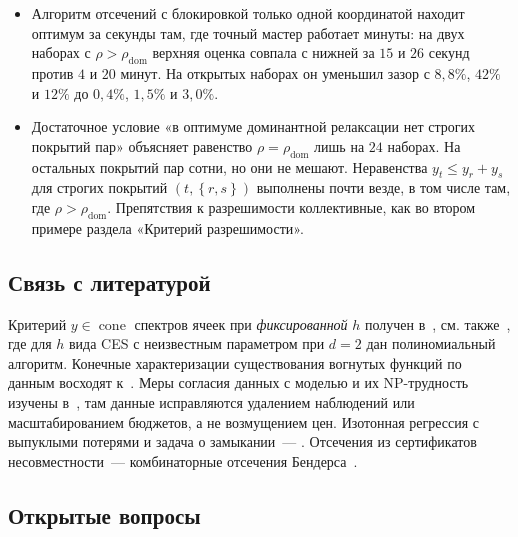 \documentclass[a4paper,11pt]{article}
\theoremstyle{plain}
\theoremstyle{definition}
\theoremstyle{remark}
\newcommand{\set}[1]{\left\{ #1 \right\}}
\DeclareMathOperator{\cone}{cone}
\begin{document}
\begin{itemize}
    \item Алгоритм отсечений с блокировкой только одной координатой находит оптимум за секунды там, где точный мастер работает минуты: на двух наборах с $\rho>\rho_{\mathrm{dom}}$ верхняя оценка совпала с нижней за $15$ и $26$ секунд против $4$ и $20$ минут. На открытых наборах он уменьшил зазор с $8{,}8\%$, $42\%$ и $12\%$ до $0{,}4\%$, $1{,}5\%$ и $3{,}0\%$.
    \item Достаточное условие «в оптимуме доминантной релаксации нет строгих покрытий пар» объясняет равенство $\rho=\rho_{\mathrm{dom}}$ лишь на $24$ наборах. На остальных покрытий пар сотни, но они не мешают. Неравенства $y_t\le y_r+y_s$ для строгих покрытий $(t,\set{r,s})$ выполнены почти везде, в том числе там, где $\rho>\rho_{\mathrm{dom}}$. Препятствия к разрешимости коллективные, как во втором примере раздела «Критерий разрешимости».
\end{itemize}

\subsection{Связь с литературой}

Критерий $y\in\cone$ спектров ячеек при \emph{фиксированной} $h$ получен в~\cite{Shananin99}, см. также~\cite{AMS}, где для $h$ вида CES с неизвестным параметром при $d=2$ дан полиномиальный алгоритм. Конечные характеризации существования вогнутых функций по данным восходят к~\cite{Afriat67,Varian84}. Меры согласия данных с моделью и их NP-трудность изучены в~\cite{CDSS14}, там данные исправляются удалением наблюдений или масштабированием бюджетов, а не возмущением цен. Изотонная регрессия с выпуклыми потерями и задача о замыкании~--- \cite{HochbaumQueyranne,Picard}. Отсечения из сертификатов несовместности~--- комбинаторные отсечения Бендерса~\cite{CodatoFischetti,HookerOttosson}.

\subsection{Открытые вопросы}
\end{document}
